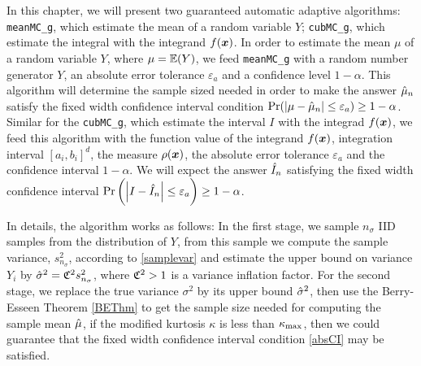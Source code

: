 \documentclass{iitthesis}
\theoremstyle{definition}
\begin{document}
\label{chapter:meanMCabsg}

In this chapter, we will present two guaranteed automatic adaptive algorithms: {\tt meanMC\_g}, which estimate the mean of a random variable $Y$; {\tt cubMC\_g}, which estimate the integral with the integrand $f(\boldsymbol{x})$. In order to estimate the mean $\mu$ of a random variable $Y$, where $\mu = \mathbb{E}(Y)$, we feed {\tt meanMC\_g} with a random number generator $Y$, an absolute error tolerance $\varepsilon_a$ and a confidence level $1-\alpha$. This algorithm will determine the sample sized needed in order to make the answer $\hat{\mu}_n$ satisfy the fixed width confidence interval condition $\Pr (\left \lvert \mu-\hat{\mu}_n \right \rvert \leq \varepsilon_a) \geq 1-\alpha$. Similar for the {\tt cubMC\_g}, which estimate the interval $I$ with the integrad $f(\boldsymbol{x})$, we feed this algorithm with the function value of the integrand $f(\boldsymbol{x})$, integration interval $[a_i,b_i]^d$, the measure $\rho(\boldsymbol{x})$, the absolute error tolerance $\varepsilon_a$ and the confidence interval $1-\alpha$. We will expect the answer $\hat{I}_n$ satisfying the fixed width confidence interval $\Pr \left(\left \lvert I-\hat{I}_n \right \rvert \leq \varepsilon_a\right) \geq 1-\alpha$.

In details, the algorithm works as follows: In the first stage, we sample $n_\sigma$ IID samples from the distribution of $Y$, from this sample we compute the sample variance, $s_{n_\sigma}^2$, according to \eqref{samplevar} and estimate the upper bound on variance $Y_i$ by $\hat{\sigma}^2 = \mathfrak{C}^2s_{n_{\sigma}}^2$, where $\mathfrak{C}^2>1$ is a variance inflation factor. For the second stage, we replace the true variance $\sigma^2$ by its upper bound $\hat{\sigma}^2$, then use the Berry-Esseen Theorem \ref{BEThm} to get the sample size needed for computing the sample mean $\hat{\mu}$, if the modified kurtosis $\kappa$ is less than $\kappa_{\max}$, then we could guarantee that the fixed width confidence interval condition \eqref{absCI} may be satisfied.

 \label{sec:meanMCabsg}
\end{document}
